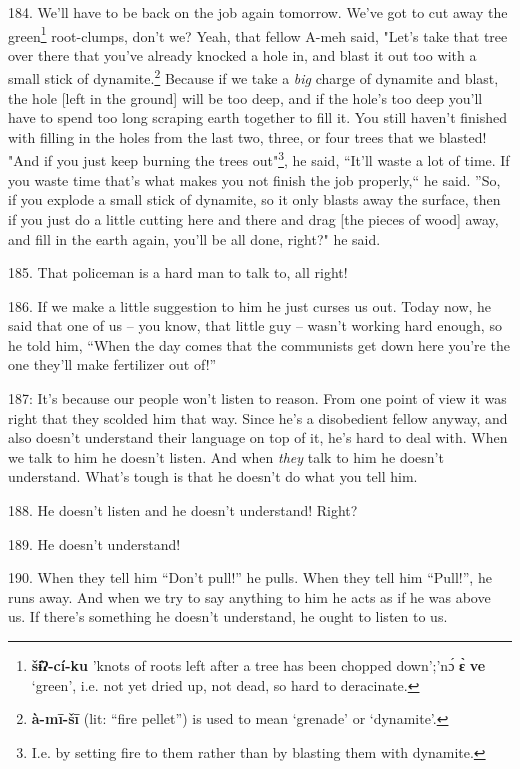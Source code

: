 184. We'll have to be back on the job again tomorrow. We've got to cut away the
green\footnote{\textbf{šɨ̂ʔ-cí-ku} 'knots of roots left after a tree has been chopped down';'nɔ́ \textbf{ɛ̀} \textbf{ve} `green', i.e. not yet dried up, not dead, so hard to deracinate.} root-clumps, don't we? Yeah, that fellow A-meh said, "Let's
take that tree over there that you've already knocked a hole in, and blast it out
too with a small stick of dynamite.\footnote{\textbf{à-mī-šī} (lit: ``fire pellet'') is used to mean `grenade' or `dynamite'.} Because if we take a \textit{big} charge
of dynamite and blast, the hole [left in the ground] will be too deep, and if the
hole's too deep you'll have to spend too long scraping earth together to fill it.
You still haven't finished with filling in the holes from the last two, three,
or four trees that we blasted! "And if you just keep burning the trees
out"\footnote{I.e. by setting fire to them rather than by blasting them with dynamite.}, he said, ``It'll waste a lot of time. If you waste time that's
what makes you not finish the job properly,`` he said. ''So, if
you explode a small stick of dynamite, so it only blasts away the surface, then
if you just do a little cutting here and there and drag [the pieces of wood] away,
and fill in the earth again, you'll be all done, right?" he said.

185. That policeman is a hard man to talk to, all right!

186. If we make a little suggestion to him he just curses us out. Today now, he
said that one of us -- you know, that little guy -- wasn't working hard enough,
so he told him, ``When the day comes that the communists get down here you're the
one they'll make fertilizer out of!''

 187: It's because our people won't listen to reason.
From one point of view it was right that they scolded him that way. Since he's
a disobedient fellow anyway, and also doesn't understand their language on top
of it, he's hard to deal with. When we talk to him he doesn't listen. And when
\textit{they} talk to him he doesn't understand. What's tough is that he doesn't
do what you tell him.

188. He doesn't listen and he doesn't understand! Right?

189. He doesn't understand!

190. When they tell him ``Don't pull!'' he pulls. When they tell
him ``Pull!'', he runs away. And when we try to say anything to
him he acts as if he was above us. If there's something he doesn't understand,
he ought to listen to us.

